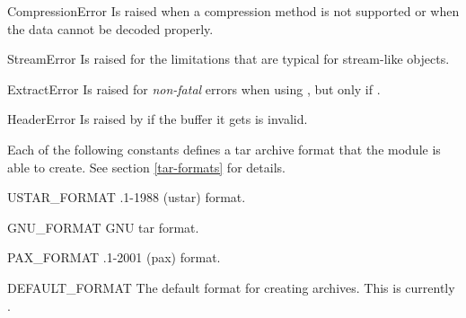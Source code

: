 \begin{excdesc}{CompressionError}
    Is raised when a compression method is not supported or when the data
    cannot be decoded properly.
\end{excdesc}

\begin{excdesc}{StreamError}
    Is raised for the limitations that are typical for stream-like
     objects.
\end{excdesc}

\begin{excdesc}{ExtractError}
    Is raised for \emph{non-fatal} errors when using , but
    only if .
\end{excdesc}

\begin{excdesc}{HeaderError}
    Is raised by  if the buffer it gets is invalid.
\end{excdesc}

Each of the following constants defines a tar archive format that the
 module is able to create. See section \ref{tar-formats} for
details.

\begin{datadesc}{USTAR_FORMAT}
    \POSIX{}.1-1988 (ustar) format.
\end{datadesc}

\begin{datadesc}{GNU_FORMAT}
    GNU tar format.
\end{datadesc}

\begin{datadesc}{PAX_FORMAT}
    \POSIX{}.1-2001 (pax) format.
\end{datadesc}

\begin{datadesc}{DEFAULT_FORMAT}
    The default format for creating archives. This is currently
    .
\end{datadesc}

\begin{seealso}

\end{seealso}

